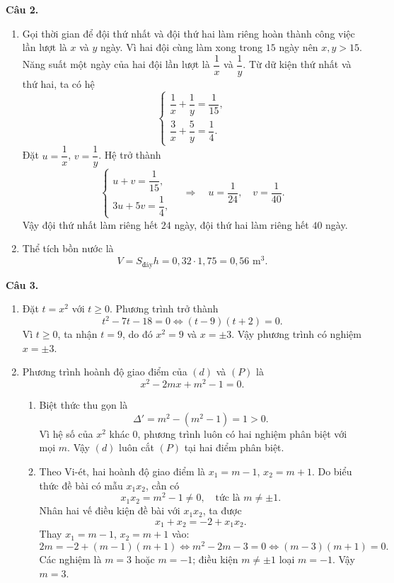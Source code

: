 \documentclass[12pt,a4paper]{article}
\begin{document}
\textbf{Câu 2.}
\begin{enumerate}[label=\alph*)]
  \item Gọi thời gian để đội thứ nhất và đội thứ hai làm riêng hoàn thành công việc lần lượt là $x$ và $y$ ngày. Vì hai đội cùng làm xong trong $15$ ngày nên $x,y>15$. Năng suất một ngày của hai đội lần lượt là $\dfrac1x$ và $\dfrac1y$. Từ dữ kiện thứ nhất và thứ hai, ta có hệ
  \[
  \begin{cases}
  \dfrac1x+\dfrac1y=\dfrac1{15},\\[4pt]
  \dfrac3x+\dfrac5y=\dfrac14.
  \end{cases}
  \]
  Đặt $u=\dfrac1x$, $v=\dfrac1y$. Hệ trở thành
  \[
  \begin{cases}
  u+v=\dfrac1{15},\\[4pt]
  3u+5v=\dfrac14,
  \end{cases}
  \quad\Longrightarrow\quad u=\frac1{24},\quad v=\frac1{40}.
  \]
  Vậy đội thứ nhất làm riêng hết $24$ ngày, đội thứ hai làm riêng hết $40$ ngày.
  \item Thể tích bồn nước là
  \[
  V=S_{\text{đáy}}h=0{,}32\cdot1{,}75=0{,}56\text{ m}^3.
  \]
\end{enumerate}

\textbf{Câu 3.}
\begin{enumerate}[label=\arabic*)]
  \item Đặt $t=x^2$ với $t\ge0$. Phương trình trở thành
  \[
  t^2-7t-18=0\Longleftrightarrow (t-9)(t+2)=0.
  \]
  Vì $t\ge0$, ta nhận $t=9$, do đó $x^2=9$ và $x=\pm3$. Vậy phương trình có nghiệm $x=\pm3$.
  \item Phương trình hoành độ giao điểm của $(d)$ và $(P)$ là
  \[
  x^2-2mx+m^2-1=0.
  \]
  \begin{enumerate}[label=\alph*)]
    \item Biệt thức thu gọn là
    \[
    \Delta'=m^2-(m^2-1)=1>0.
    \]
    Vì hệ số của $x^2$ khác $0$, phương trình luôn có hai nghiệm phân biệt với mọi $m$. Vậy $(d)$ luôn cắt $(P)$ tại hai điểm phân biệt.
    \item Theo Vi-ét, hai hoành độ giao điểm là $x_1=m-1$, $x_2=m+1$. Do biểu thức đề bài có mẫu $x_1x_2$, cần có
    \[
    x_1x_2=m^2-1\ne0,\quad\text{tức là }m\ne\pm1.
    \]
    Nhân hai vế điều kiện đề bài với $x_1x_2$, ta được
    \[
    x_1+x_2=-2+x_1x_2.
    \]
    Thay $x_1=m-1$, $x_2=m+1$ vào:
    \[
    2m=-2+(m-1)(m+1)
    \Longleftrightarrow m^2-2m-3=0
    \Longleftrightarrow (m-3)(m+1)=0.
    \]
    Các nghiệm là $m=3$ hoặc $m=-1$; điều kiện $m\ne\pm1$ loại $m=-1$. Vậy $m=3$.
  \end{enumerate}
\end{enumerate}
\end{document}
